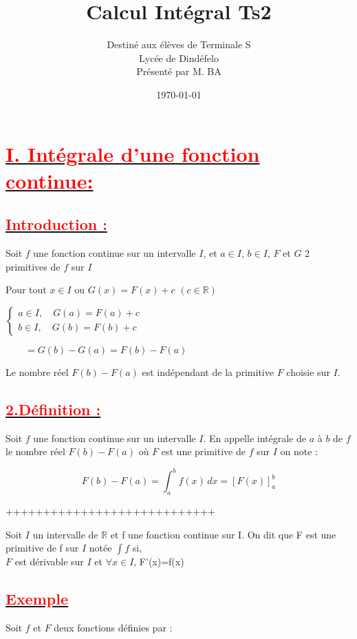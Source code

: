 \documentclass[12pt]{article}
\author{Destiné aux élèves de Terminale S\\Lycée de Dindéfelo\\Présenté par M. BA}
\title{\textbf{Calcul Intégral Ts2}}
\date{\today}
\begin{document}
\maketitle
\newpage

\section*{\underline{\textbf{\textcolor{red}{I. Intégrale d'une fonction continue: }}}}
\subsection*{\underline{\textbf{\textcolor{red}{Introduction :}}}}

Soit \( f \) une fonction continue sur un intervalle \( I \), et \( a \in I \), \( b \in I \), \( F \) et \( G \) 2 primitives de \( f \) sur \( I \)

Pour tout \( x \in I \) ou \( G(x) = F(x) + c \) \( (c\in \mathbb{R}) \)

\underline{\( 
\begin{cases}
a \in I,\quad  G(a) = F(a) + c\\
b \in I,\quad G(b) = F(b) + c
\end{cases}
\)}

\(
\quad\quad=G(b) - G(a) = F(b) - F(a)
\)

Le nombre réel \( F(b) - F(a) \) est indépendant de la primitive \( F \) choisie sur \( I \).

\subsection*{\underline{\textbf{\textcolor{red}{2.Définition :}}}}

Soit \( f \) une fonction continue sur un intervalle \( I \).
En appelle intégrale de \( a \) à \( b \) de \( f \) le nombre réel \( F(b) - F(a) \) où \( F \) est une primitive de \( f \) sur \( I \) on note :

\[
F(b) - F(a) = \int_{a}^{b} f(x) \, dx = \left[ F(x) \right]_{a}^{b}
\]

++++++++++++++++++++++++++++

Soit $I$ un intervalle de $\mathbb{R}$  et  f une fonction continue sur I. On dit que F est une primitive de f sur $I$ notée $\int f $ si,\\ $F$ est dérivable sur $I$ et $\forall x \in I$, F'(x)=f(x)
\subsection*{\underline{\textbf{\textcolor{red}{Exemple}}}}
Soit $f$  et  $F$ deux fonctions définies par : 
\end{document}
